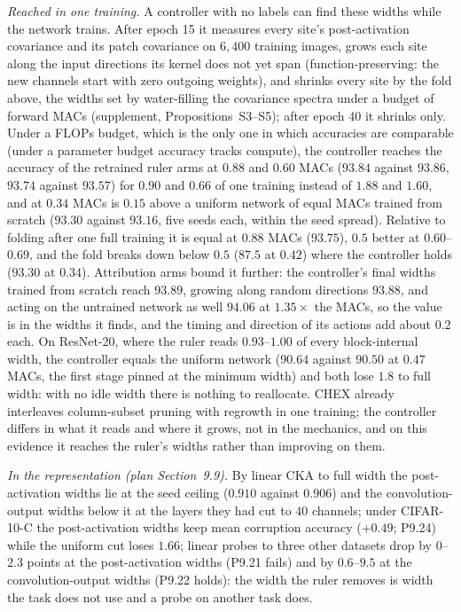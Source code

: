 \documentclass[10pt,journal,compsoc]{IEEEtran}
\begin{document}
\emph{Reached in one training.} A controller with no labels can find these
widths while the network trains. After epoch 15 it measures every site's
post-activation covariance and its patch covariance on $6{,}400$ training
images, grows each site along the input directions its kernel does not
yet span (function-preserving: the new channels start with zero outgoing
weights), and shrinks every site by the fold above, the widths set by
water-filling the covariance spectra under a budget of forward MACs
(supplement, Propositions~S3--S5); after epoch 40 it shrinks only. Under a
FLOPs budget, which is the only one in which accuracies are comparable
(under a parameter budget accuracy tracks compute), the controller reaches the accuracy of the retrained
ruler arms at $0.88$ and $0.60$ MACs ($93.84$ against $93.86$, $93.74$
against $93.57$) for $0.90$ and $0.66$ of one training instead of $1.88$
and $1.60$, and at $0.34$ MACs is $0.15$ above a uniform network of equal
MACs trained from scratch ($93.30$ against $93.16$, five seeds each,
within the seed spread). Relative to folding after one full training it is equal at $0.88$
MACs ($93.75$), $0.5$ better at $0.60$--$0.69$, and the fold breaks down below $0.5$ ($87.5$ at $0.42$) where the
controller holds ($93.30$ at $0.34$). Attribution arms bound it further: the controller's final widths
trained from scratch reach $93.89$, growing along random directions
$93.88$, and acting on the untrained network as well $94.06$ at
$1.35\times$ the MACs, so the value is in the widths it finds, and the
timing and direction of its actions add about $0.2$ each. On ResNet-20,
where the ruler reads $0.93$--$1.00$ of every block-internal width, the
controller equals the uniform network ($90.64$ against $90.50$ at $0.47$
MACs, the first stage pinned at the minimum width) and both lose $1.8$ to
full width: with no idle width there is nothing to reallocate. CHEX
\cite{hou2022chex} already interleaves column-subset pruning with regrowth
in one training; the controller differs in what it reads and where it
grows, not in the mechanics, and on this evidence it reaches the ruler's
widths rather than improving on them.

\emph{In the representation (plan Section~9.9).} By linear CKA
\cite{kornblith2019cka} to full width the post-activation widths lie at
the seed ceiling ($0.910$ against $0.906$) and the convolution-output
widths below it at the layers they had cut to $40$ channels; under
CIFAR-10-C \cite{hendrycks2019robustness} the post-activation widths keep
mean corruption accuracy ($+0.49$; P9.24) while the uniform cut loses
$1.66$; linear probes to three other datasets drop by $0$--$2.3$ points at the
post-activation widths (P9.21 fails) and by $0.6$--$9.5$ at the
convolution-output widths (P9.22 holds): the width
the ruler removes is width the task does not use and a probe on another
task does.
\end{document}
